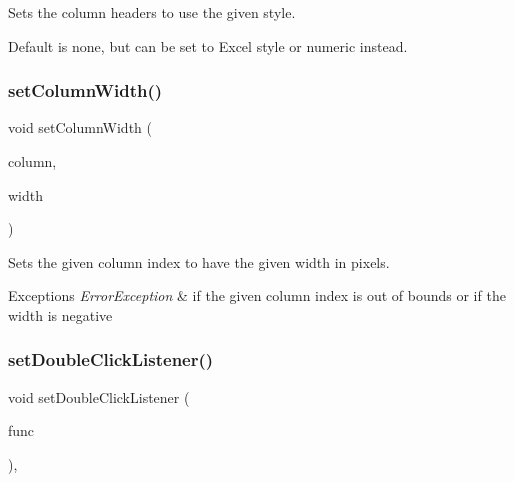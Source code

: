 Sets the column headers to use the given style. 

Default is none, but can be set to Excel style or numeric instead. \mbox{\label{classsgl_1_1GTable_a52075dc231c73a896bcef426047fd327}} 
\subsubsection{\texorpdfstring{set\+Column\+Width()}{setColumnWidth()}}
{\footnotesize\ttfamily void set\+Column\+Width (\begin{DoxyParamCaption}\item[{int}]{column,  }\item[{double}]{width }\end{DoxyParamCaption})\hspace{0.3cm}{\ttfamily [virtual]}}



Sets the given column index to have the given width in pixels. 


\begin{DoxyExceptions}{Exceptions}
{\em Error\+Exception} & if the given column index is out of bounds or if the width is negative \\
\hline
\end{DoxyExceptions}
\mbox{\label{classsgl_1_1GInteractor_ac29f9a3462458e165fae3a1f046ee77a}} 
\subsubsection{\texorpdfstring{set\+Double\+Click\+Listener()}{setDoubleClickListener()}\hspace{0.1cm}{\footnotesize\ttfamily [1/2]}}
{\footnotesize\ttfamily void set\+Double\+Click\+Listener (\begin{DoxyParamCaption}\item[{\mbox{\hyperlink{namespacesgl_ae9f3e9eab70035da1a2b114e21357b25}{G\+Event\+Listener}}}]{func }\end{DoxyParamCaption})\hspace{0.3cm}{\ttfamily [virtual]}, {\ttfamily [inherited]}}



